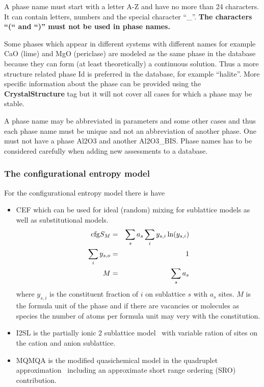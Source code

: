 \documentclass{article}
\begin{document}
A phase name must start with a letter A-Z and have no more than 24
characters.  It can contain letters, numbers and the special character
``\_''.  {\bf The characters ``(`` and ``)'' must not be used in phase
  names.}   

Some phases which appear in different systems with different names for
example CaO (lime) and MgO (periclase) are modeled as the same phase
in the database because they can form (at least theoretically) a
continuous solution.  Thus a more structure related phase {\rm Id} is
preferred in the database, for example ``halite''.  More specific
information about the phase can be provided using the {\bf
  CrystalStructure} tag but it will not cover all cases for which a
phase may be stable.

A phase name may be abbreviated in parameters and some other cases and
thus each phase name must be unique and not an abbreviation of another
phase.  One must not have a phase Al2O3 and another Al2O3\_BIS.  Phase
names has to be considered carefully when adding new assessments to a
database.

\subsubsection{The configurational entropy model}\label{sec:cfg}

For the configurational entropy model there is have
\begin{itemize}
\item CEF which can be used for ideal (random) mixing for
  sublattice models as well as substitutional models.
  \begin{eqnarray}
    ~{\rm cfg}S_M &=& \sum_s a_s \sum_i y_{s,i} \ln(y_{s,i}) \label{eq:idealmix}\\
    \sum_i y_{s,o} &=& 1 \\
    M &=& \sum_s a_s     \label{eq:formulaunit}
  \end{eqnarray}
  where $y_{s,i}$ is the constituent fraction of $i$ on sublattice $s$
  with $a_s$ sites.  $M$ is the formula unit of the phase and if there
  are vacancies or molecules as species the number of atoms per
  formula unit may very with the constitution.
  
\item I2SL is the partially ionic 2 sublattice
  model~\cite{85Hil,91Sun} with variable ration of sites on the cation
  and anion sublattice.
  
\item MQMQA is the modified quasichemical model in the quadruplet
  approximation~\cite{01Pel2} including an approximate short range
  ordering (SRO) contribution.
  
\end{itemize}
\end{document}
